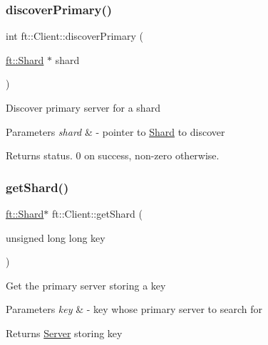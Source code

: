 \subsubsection{\texorpdfstring{discover\+Primary()}{discoverPrimary()}}
{\footnotesize\ttfamily int ft\+::\+Client\+::discover\+Primary (\begin{DoxyParamCaption}\item[{\mbox{\hyperlink{classft_1_1Shard}{ft\+::\+Shard}} $\ast$}]{shard }\end{DoxyParamCaption})}

Discover primary server for a shard


\begin{DoxyParams}{Parameters}
{\em shard} & -\/ pointer to \mbox{\hyperlink{classft_1_1Shard}{Shard}} to discover\\
\hline
\end{DoxyParams}
\begin{DoxyReturn}{Returns}
status. 0 on success, non-\/zero otherwise. 
\end{DoxyReturn}
\mbox{\label{classft_1_1Client_ac415215bb013b2d9832fe844c5d1c07a}} 
\subsubsection{\texorpdfstring{get\+Shard()}{getShard()}}
{\footnotesize\ttfamily \mbox{\hyperlink{classft_1_1Shard}{ft\+::\+Shard}}$\ast$ ft\+::\+Client\+::get\+Shard (\begin{DoxyParamCaption}\item[{unsigned long long}]{key }\end{DoxyParamCaption})}

Get the primary server storing a key


\begin{DoxyParams}{Parameters}
{\em key} & -\/ key whose primary server to search for\\
\hline
\end{DoxyParams}
\begin{DoxyReturn}{Returns}
\mbox{\hyperlink{classft_1_1Server}{Server}} storing key 
\end{DoxyReturn}
\mbox{\label{classft_1_1Client_a063db70469c9f2715bbad637d0353680}} 
